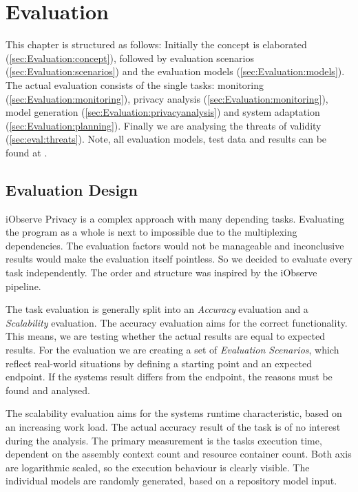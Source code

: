 
\chapter{Evaluation}
\label{ch:Evaluation}

This chapter is structured as follows: Initially the concept is elaborated (\autoref{sec:Evaluation:concept}), followed by evaluation scenarios (\autoref{sec:Evaluation:scenarios}) and the evaluation models (\autoref{sec:Evaluation:models}). The actual evaluation consists of the single tasks: monitoring (\autoref{sec:Evaluation:monitoring}), privacy analysis (\autoref{sec:Evaluation:monitoring}), model generation (\autoref{sec:Evaluation:privacyanalysis}) and system adaptation (\autoref{sec:Evaluation:planning}). Finally we are analysing the threats of validity (\autoref{sec:eval:threats}). Note, all evaluation models, test data and results can be found at \cite{privacy.PW}.

\section{Evaluation Design}
\label{sec:Evaluation:concept}

iObserve Privacy is a complex approach with many depending tasks. Evaluating the program as a whole is next to impossible due to the multiplexing dependencies. The evaluation factors would not be manageable and inconclusive results would make the evaluation itself pointless. So we decided to evaluate every task independently. The order and structure was inspired by the iObserve pipeline.

The task evaluation is generally split into an \textit{Accuracy} evaluation and a \textit{Scalability} evaluation. The accuracy evaluation aims for the correct functionality. This means, we are testing whether the actual results are equal to expected results. For the evaluation we are creating a set of \textit{Evaluation Scenarios}, which reflect real-world situations by defining a starting point and an expected endpoint. If the systems result differs from the endpoint, the reasons must be found and analysed.

The scalability evaluation aims for the systems runtime characteristic, based on an increasing work load. The actual accuracy result of the task is of no interest during the analysis. The primary measurement is the tasks execution time, dependent on the assembly context count and resource container count. Both axis are logarithmic scaled, so the execution behaviour is clearly visible. The individual models are randomly generated, based on a repository model input.

